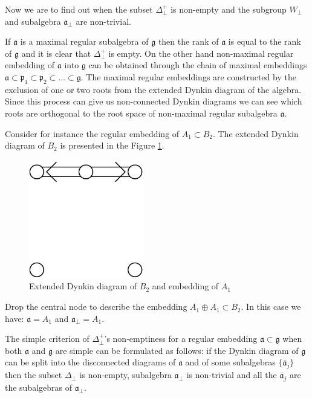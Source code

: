 \documentclass[a4paper,12pt]{article}
\theoremstyle{definition} \newtheorem{Def}{Definition}
\begin{document}
Now we are to find out when the subset $\Delta^{+}_{\bot}$ is non-empty
and the subgroup $W_{\bot}$ and subalgebra $\mathfrak{a}_{\bot}$ are non-trivial.

If $\mathfrak{a}$ is a maximal regular subalgebra of $\mathfrak{g}$ then
the rank of $\mathfrak{a}$ is equal to the rank of $\mathfrak{g}$ and
it is clear that $\Delta^{+}_{\bot}$ is empty.
On the other hand
non-maximal regular embedding of $\mathfrak{a}$ into $\mathfrak{g}$ can be obtained
through the chain of maximal embeddings
$\mathfrak{a}\subset \mathfrak{p}_1\subset \mathfrak{p}_2\subset\dots \subset \mathfrak{g}$.
The maximal regular embeddings are constructed by the exclusion of one or two roots
from the extended Dynkin diagram of the algebra. Since this process can give us
non-connected Dynkin diagrams we can see which roots are orthogonal to the root
space of non-maximal regular subalgebra $\mathfrak{a}$.

Consider for instance the regular embedding of $A_1\subset B_2$.
The extended Dynkin diagram of $B_2$ is presented in the Figure \ref{fig:B2Dynkin}.
\begin{figure}[ph]
  \centering
  \includegraphics[width=50mm]{B2_A1_diagram.pdf}
  \caption{Extended Dynkin diagram of $B_2$ and embedding of $A_1$}
  \label{fig:B2Dynkin}
\end{figure}
Drop the central node to describe the embedding $A_1\oplus A_1\subset B_2$.
In this case we have: $\mathfrak{a}=A_1$ and $\mathfrak{a}_{\bot}=A_1$.

The simple criterion of $\Delta^{+}_{\bot}$'s non-emptiness for a regular
embedding $\mathfrak{a}\subset \mathfrak{g}$
when both $\mathfrak{a}$ and $\mathfrak{g}$ are simple can be formulated
as follows:
if the Dynkin diagram of $\mathfrak{g}$ can be split into the disconnected
diagrams of $\mathfrak{a}$ and of some subalgebras $\{\mathfrak{\bar{a}}_j\}$
then the subset $\Delta_{\bot}$ is non-empty,
subalgebra $\mathfrak{a}_{\bot}$ is non-trivial and all the
$\mathfrak{\bar{a}}_j$ are the subalgebras of $\mathfrak{a}_{\bot}$.
\end{document}
